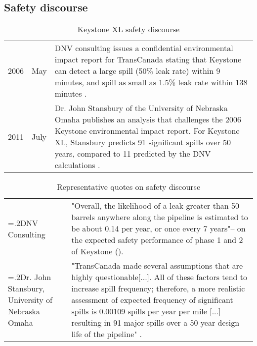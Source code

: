 
\subsection*{Safety discourse}

\begin{table}[H]
	\caption{Keystone XL safety discourse}

	\begin{tabularx}{\textwidth}{r @{\hspace{0.5\tabcolsep}} l |@{\timeline} X}
		\toprule

		2006 & May & DNV consulting issues a confidential environmental impact report for TransCanada stating that Keystone can detect a large spill (50\% leak rate) within 9 minutes, and spill as small as 1.5\% leak rate within 138 minutes \citep{DNVConsulting2006}.\\

		2011 & July & Dr. John Stansbury of the University of Nebraska Omaha publishes an analysis that challenges the 2006 Keystone environmental impact report. For Keystone XL, Stansbury predicts 91 significant spills over 50 years, compared to 11 predicted by the DNV calculations \citep{Stansbury2011}.\\

	\end{tabularx}
	\parnotes
\end{table}

\begin{table}[H]
	\caption{Representative quotes on safety discourse}

	\begin{tabularx}{\linewidth}{>{\raggedright\hsize=.2\hsize}X X}
		\toprule

		DNV Consulting & "Overall, the likelihood of a leak greater than 50 barrels anywhere along the pipeline is estimated to be about 0.14 per year, or once every 7 years"--\citeauthor{DNVConsulting2006} on the expected safety performance of phase 1 and 2 of Keystone (\citeyear[p. 23]{DNVConsulting2006}).\\

		Dr. John Stansbury, University of Nebraska Omaha & "TransCanada made several assumptions that are highly questionable[...].
		All of these factors tend to increase spill frequency; therefore, a more realistic assessment of expected frequency of significant spills is 0.00109 spills per year per mile [...] resulting in 91 major spills over a 50 year design life of the pipeline" \citep{Stansbury2011}.

	\end{tabularx}

\end{table}
